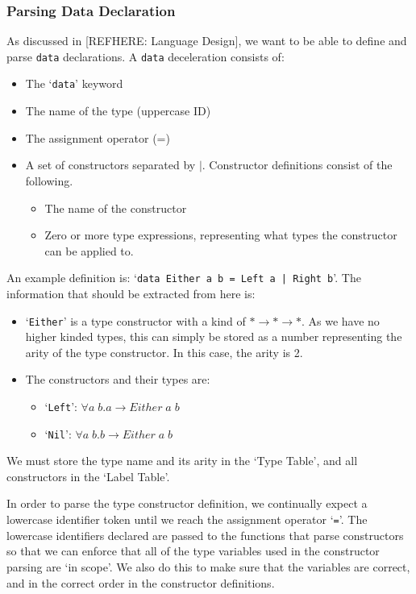 \subsubsection{Parsing Data Declaration} 
As discussed in [REFHERE: Language Design], we want to be able to define and parse \verb|data| declarations. A \verb|data| deceleration consists of: 
\begin{itemize}
    \item The `\verb|data|' keyword
    \item The name of the type (uppercase ID)
    \item The assignment operator (=)
    \item A set of constructors separated by \(\mid\). Constructor definitions consist of the following. 
        \begin{itemize}
            \item The name of the constructor
            \item Zero or more type expressions, representing what types the constructor can be applied to.
        \end{itemize}
\end{itemize}

An example definition is: `\verb!data Either a b = Left a | Right b!'. The information that should be extracted from here is:
\begin{itemize}
    \item `\verb|Either|' is a type constructor with a kind of \(*\rightarrow* \rightarrow *\). As we have no higher kinded types, this can simply be stored as a number representing the arity of the type constructor. In this case, the arity is 2.
    \item The constructors and their types are:
    \begin{itemize}
        \item `\verb|Left|': \(\forall a\;b.a\rightarrow Either\;a\;b\)
        \item `\verb|Nil|': \(\forall a\;b.b\rightarrow Either\;a\;b\)
    \end{itemize}
\end{itemize}
We must store the type name and its arity in the `Type Table', and all constructors in the `Label Table'. 

In order to parse the type constructor definition, we continually expect a lowercase identifier token until we reach the assignment operator `\verb|=|'. The lowercase identifiers declared are passed to the functions that parse constructors so that we can enforce that all of the type variables used in the constructor parsing are `in scope'. We also do this to make sure that the variables are correct, and in the correct order in the constructor definitions. 

